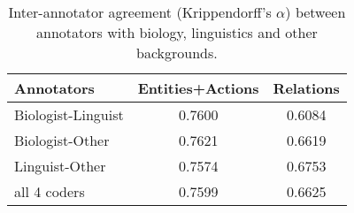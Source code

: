 \documentclass[11pt,a4paper]{article}
\begin{document}
\begin{table}[ht!]
    \centering
    \small
    \begin{tabular}{ |l||c|c|  }
        \hline
        Annotators          & Entities+Actions  & Relations \\
        \hline
        Biologist-Linguist  & 0.7600    & 0.6084   \\
        Biologist-Other     & 0.7621    & 0.6619  \\
        Linguist-Other      & 0.7574    & 0.6753  \\
        \hline
        \hline
        all 4 coders        & 0.7599      & 0.6625    \\
 \hline
\end{tabular}
\caption{ Inter-annotator agreement (Krippendorff's $\alpha$) between annotators with biology, linguistics and other backgrounds.}
    \label{tab:comparison}
\end{table}

\begin{comment}
\begin{figure*}[!ht]
  \centering
  \subfloat[Krippendorff's $\alpha$ for entities]{
    \texttt{[image: k\_alpha\_entities]}
  }
  \hspace{1cm}
  \subfloat[Krippendorff's $\alpha$ for relations]{
  \texttt{[image: k\_alpha\_relations]}
  }
  \caption{Inter-annotator agreement improves over iterations, with a few drops caused by changes in the annotation guideline.}
  \label{fig:k_alpha}
\end{figure*}
\end{comment}

\end{document}
